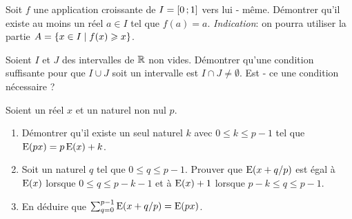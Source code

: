 \begin{exercice}
  Soit \(f\) une application croissante de \(I = \left[ 0 \, ;  1 \right]\) vers lui 
  - même. Démontrer qu'il existe au moins un réel \(a \in I\) tel que \(f(a) = 
  a\).
  \emph{Indication}: on pourra utiliser la partie \(A = \left\{x \in I\mathrel{}\middle|\mathrel{}f(x) 
  \geqslant x\right\}\).
\end{exercice}

\begin{exercice}
  Soient \(I\) et \(J\) des intervalles de \(\mathbb{R}\) non vides. Démontrer qu'une 
  condition suffisante pour que \(I \cup J\) soit un intervalle est \(I \cap J 
  \neq \emptyset\). Est - ce une condition nécessaire ?
\end{exercice}

\begin{exercice}
  Soient un réel \(x\) et un naturel non nul \(p\).
  \begin{enumerate}
    \item Démontrer qu'il existe un seul naturel \(k\) avec \(0 \leqslant k 
      \leqslant p - 1\) tel que \(\operatorname{E}(px) = p\operatorname{E}(x) + k\).
    \item Soit un naturel \(q\) tel que \(0 \leqslant q \leqslant p - 1\).  
      Prouver que \(\operatorname{E}(x + q/p)\) est égal à \(\operatorname{E}(x)\) lorsque \(0 \leqslant 
      q \leqslant p - k - 1\) et à \(\operatorname{E}(x) + 1\) lorsque \(p - k\leqslant q 
      \leqslant p - 1\).
    \item En déduire que \(\sum_{q = 0}^{p - 1} \operatorname{E}(x + q/p) = \operatorname{E}(px)\).
  \end{enumerate}
\end{exercice}
